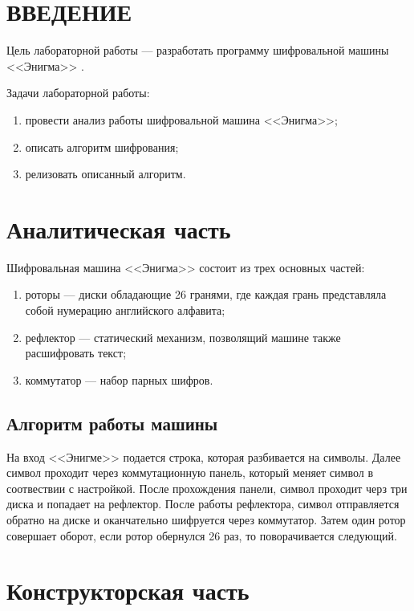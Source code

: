 \section*{\large{ВВЕДЕНИЕ}}

Цель лабораторной работы --- разработать программу шифровальной машины <<Энигма>> \cite{Enigma}.

Задачи лабораторной работы:

\begin{enumerate}
    \item провести анализ работы шифровальной машина <<Энигма>>;
    \item описать алгоритм шифрования;
    \item релизовать описанный алгоритм.
\end{enumerate}

\clearpage
\section{Аналитическая часть}

Шифровальная машина <<Энигма>> состоит из трех основных частей:
\begin{enumerate}
    \item роторы --- диски обладающие 26 гранями, где каждая грань представляла собой нумерацию английского алфавита;
    \item рефлектор --- статический механизм, позволящий машине также расшифровать текст;
    \item коммутатор --- набор парных шифров.
\end{enumerate}

\subsection{Алгоритм работы машины}

На вход <<Энигме>> подается строка, которая разбивается на символы. 
Далее символ проходит через коммутационную панель, который меняет символ в соотвествии с настройкой.
После прохождения панели, символ проходит черз три диска и попадает на рефлектор.
После работы рефлектора, символ отправляется обратно на диске и оканчательно шифруется через коммутатор.
Затем один ротор совершает оборот, если ротор обернулся 26 раз, то поворачивается следующий.


\clearpage

\section{Конструкторская часть}

